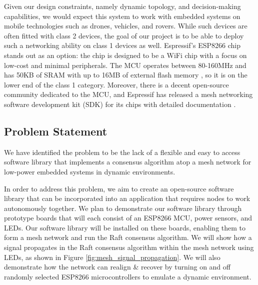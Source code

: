 Given our design constraints, namely dynamic topology, and decision-making capabilities, we would expect this system to work with embedded systems on mobile technologies such as drones, vehicles, and rovers. While such devices are often fitted with class 2 devices, the goal of our project is to be able to deploy such a networking ability on class 1 devices as well. Espressif's ESP8266 chip stands out as an option: the chip is designed to be a WiFi chip with a focus on low-cost and minimal peripherals. The MCU operates between 80-160MHz and has 50KB of SRAM with up to 16MB of external flash memory \cite{espressif:esp8266}, so it is on the lower end of the class 1 category. Moreover, there is a decent open-source community dedicated to the MCU, and Espressif has released a mesh networking software development kit (SDK) for its chips with detailed documentation \cite{esp-mesh-docs}. 


\subsection{Problem Statement}

We have identified the problem to be the lack of a flexible and easy to access software library that implements a consensus algorithm atop a mesh network for low-power embedded systems in dynamic environments.


In order to address this problem, we aim to create an open-source software library that can be incorporated into an application that requires nodes to work autonomously together. We plan to demonstrate our software library through prototype boards that will each consist of an ESP8266 MCU, power sensors, and LEDs. Our software library will be installed on these boards, enabling them to form a mesh network and run the Raft consensus algorithm. We will show how a signal propagates in the Raft consensus algorithm within the mesh network using LEDs, as shown in Figure \ref{fig:mesh_signal_propagation}. We will also demonstrate how the network can realign \& recover by turning on and off randomly selected ESP8266 microcontrollers to emulate a dynamic environment.

